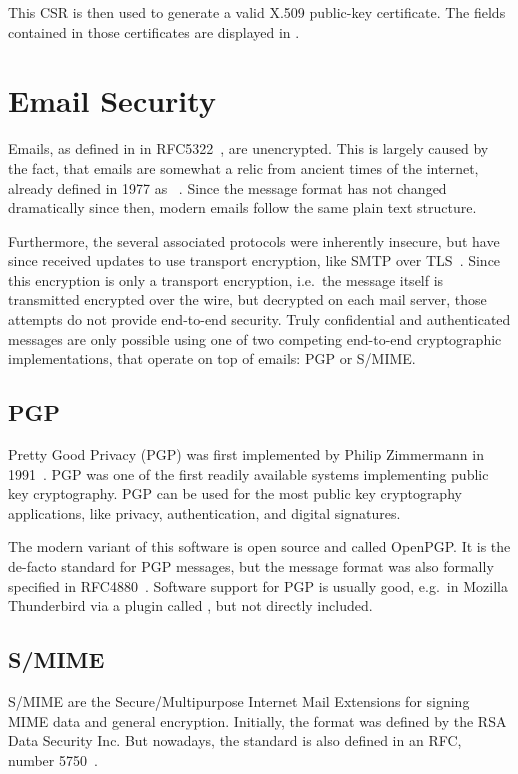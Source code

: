 This CSR is then used to generate a valid X.509 public-key certificate.
The fields contained in those certificates are displayed in .

\section{Email Security}\label{sec:emailSecurity}

Emails, as defined in in RFC5322~\cite{RFC5322}, are unencrypted.
This is largely caused by the fact, that emails are somewhat a relic from ancient times of the internet, already
defined in 1977 as ~\cite{RFC0733}.
Since the message format has not changed dramatically since then, modern emails follow the same plain text structure.

Furthermore, the several associated protocols were inherently insecure, but have since received updates to use transport
encryption, like SMTP over TLS~\cite{RFC3207}.
Since this encryption is only a transport encryption, i.e.\ the message itself is transmitted encrypted over the wire,
but decrypted on each mail server, those attempts do not provide end-to-end security.
Truly confidential and authenticated messages are only possible using one of two competing end-to-end cryptographic
implementations, that operate on top of emails: PGP or S/MIME\@.

\subsection{PGP}\label{subsec:pgp}
Pretty Good Privacy (PGP) was first implemented by Philip Zimmermann in 1991~\cite{zimmermann1995official}.
PGP was one of the first readily available systems implementing public key cryptography.
PGP can be used for the most public key cryptography applications, like privacy, authentication, and digital signatures.

The modern variant of this software is open source and called OpenPGP\@.
It is the de-facto standard for PGP messages, but the message format was also formally specified in
RFC4880~\cite{RFC4880}.
Software support for PGP is usually good, e.g.\ in Mozilla Thunderbird via a plugin called , but not
directly included.

\subsection{S/MIME}\label{subsec:s/mime}
S/MIME are the Secure/Multipurpose Internet Mail Extensions for signing MIME data and general encryption.
Initially, the format was defined by the RSA Data Security Inc.
But nowadays, the standard is also defined in an RFC, number 5750~\cite{RFC5750}.

